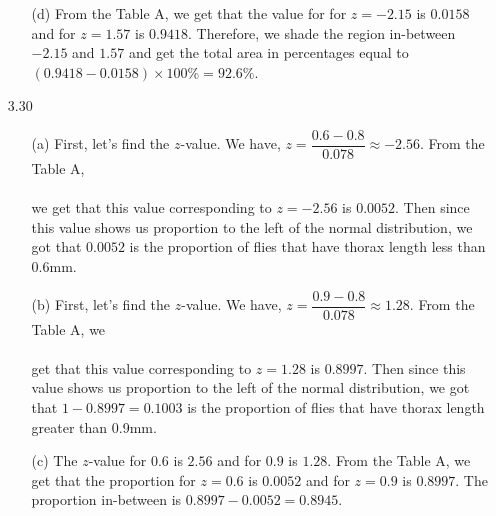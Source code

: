 \documentclass[11pt, a4paper]{article}
\begin{document}
\begin{itemize}
\begin{itemize}
\item[(d)]
From the Table A, we get that the value for for $z = -2.15$ is $0.0158$
and for $z = 1.57$ is $0.9418$. Therefore, we shade the region in-between
$-2.15$ and $1.57$ and get the total area in percentages
equal to $(0.9418 - 0.0158) \times 100\% = 92.6\%$.
\item[]
\item[]
\item[]
\end{itemize}

\item[]
\item[]

\item[3.30]
\begin{itemize}
\item[(a)]
First, let's find the $z$-value. We have, $z = \dfrac{0.6 - 0.8}{0.078} \approx -2.56$. From the Table A,\\
\vspace{0.05cm}
\\
we get that this value corresponding to $z = -2.56$ is $0.0052$. Then since this value shows us proportion to the left of the normal distribution, we got that $0.0052$ is the proportion of flies that have thorax length less than 0.6mm.

\item[]

\item[(b)]
First, let's find the $z$-value. We have, $z = \dfrac{0.9 - 0.8}{0.078} \approx 1.28$. From the Table A, we\\
\vspace{0.05cm}
\\
get that this value corresponding to $z = 1.28$ is $0.8997$. Then since this value shows us proportion to the left of the normal distribution,
we got that $1 - 0.8997 = 0.1003$ is the proportion of flies that have thorax length greater than 0.9mm.

\item[]

\item[(c)]
The $z$-value for $0.6$ is $2.56$ and for $0.9$ is $1.28$.
From the Table A, we get that the proportion for $z = 0.6$ is $0.0052$
and for $z = 0.9$ is $0.8997$. The proportion in-between is
$0.8997 - 0.0052 = 0.8945$.
\end{itemize}

\end{itemize}
\end{document}

